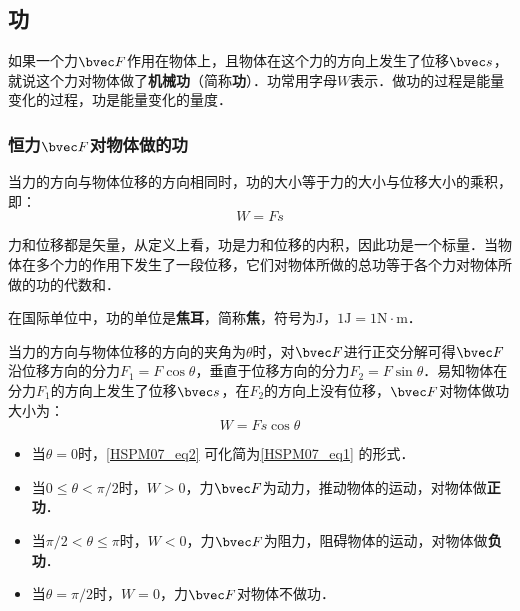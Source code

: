
\begin{issues}
\issueDraft
\issueTODO
\end{issues}

\subsection{功}

如果一个力$\bvec F$作用在物体上，且物体在这个力的方向上发生了位移$\bvec s$，就说这个力对物体做了\textbf{机械功}（简称\textbf{功}）．功常用字母$W$表示．做功的过程是能量变化的过程，功是能量变化的量度．

\subsubsection{恒力$\bvec F$对物体做的功}

当力的方向与物体位移的方向相同时，功的大小等于力的大小与位移大小的乘积，即：
\begin{equation}\label{HSPM07_eq1}
W=Fs
\end{equation}

力和位移都是矢量，从定义上看，功是力和位移的内积，因此功是一个标量．当物体在多个力的作用下发生了一段位移，它们对物体所做的总功等于各个力对物体所做的功的代数和．

在国际单位中，功的单位是\textbf{焦耳}，简称\textbf{焦}，符号为$\mathrm{J}$，$1\mathrm{J}=1\mathrm{N \cdot m}$．

当力的方向与物体位移的方向的夹角为$\theta$时，对$\bvec F$进行正交分解可得$\bvec F$沿位移方向的分力$F_1=F\cos \theta$，垂直于位移方向的分力$F_2=F\sin \theta$．易知物体在分力$F_1$的方向上发生了位移$\bvec s$，在$F_2$的方向上没有位移，$\bvec F$对物体做功大小为：
\begin{equation}\label{HSPM07_eq2}
W=Fs\cos \theta
\end{equation}

\begin{itemize}
\item 当$\theta = 0$时，\autoref{HSPM07_eq2} 可化简为\autoref{HSPM07_eq1} 的形式．
\item 当$0\leq \theta < \pi/2$时，$W>0$，力$\bvec F$为动力，推动物体的运动，对物体做\textbf{正功}．
\item 当$\pi/2< \theta \leq \pi$时，$W<0$，力$\bvec F$为阻力，阻碍物体的运动，对物体做\textbf{负功}．
\item 当$\theta = \pi/2$时，$W=0$，力$\bvec F$对物体不做功．
\end{itemize}

